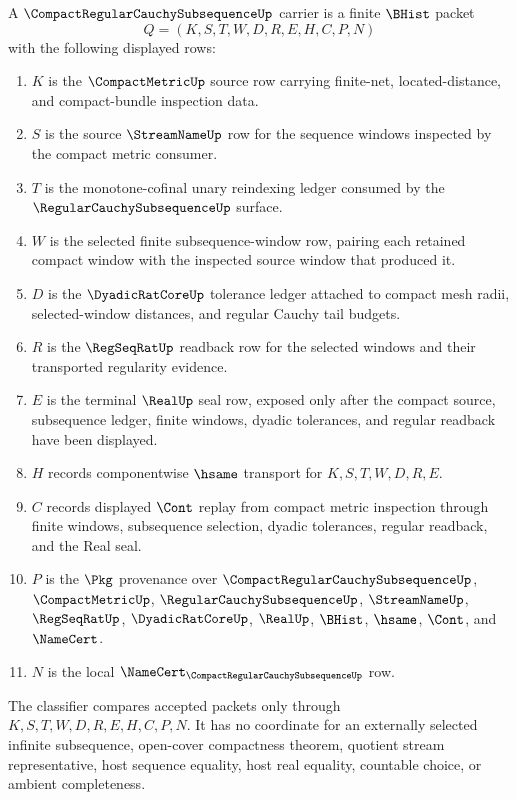 \begin{definition}
\label{def:compact-regular-cauchy-subsequence-carrier}
A $\CompactRegularCauchySubsequenceUp$ carrier is a finite $\BHist$ packet
$$
Q=(K,S,T,W,D,R,E,H,C,P,N)
$$
with the following displayed rows:
\begin{enumerate}
\item $K$ is the $\CompactMetricUp$ source row carrying finite-net, located-distance, and compact-bundle inspection data.
\item $S$ is the source $\StreamNameUp$ row for the sequence windows inspected by the compact metric consumer.
\item $T$ is the monotone-cofinal unary reindexing ledger consumed by the $\RegularCauchySubsequenceUp$ surface.
\item $W$ is the selected finite subsequence-window row, pairing each retained compact window with the inspected source window that produced it.
\item $D$ is the $\DyadicRatCoreUp$ tolerance ledger attached to compact mesh radii, selected-window distances, and regular Cauchy tail budgets.
\item $R$ is the $\RegSeqRatUp$ readback row for the selected windows and their transported regularity evidence.
\item $E$ is the terminal $\RealUp$ seal row, exposed only after the compact source, subsequence ledger, finite windows, dyadic tolerances, and regular readback have been displayed.
\item $H$ records componentwise $\hsame$ transport for $K,S,T,W,D,R,E$.
\item $C$ records displayed $\Cont$ replay from compact metric inspection through finite windows, subsequence selection, dyadic tolerances, regular readback, and the Real seal.
\item $P$ is the $\Pkg$ provenance over $\CompactRegularCauchySubsequenceUp$, $\CompactMetricUp$, $\RegularCauchySubsequenceUp$, $\StreamNameUp$, $\RegSeqRatUp$, $\DyadicRatCoreUp$, $\RealUp$, $\BHist$, $\hsame$, $\Cont$, and $\NameCert$.
\item $N$ is the local $\NameCert_{\CompactRegularCauchySubsequenceUp}$ row.
\end{enumerate}
The classifier compares accepted packets only through $K,S,T,W,D,R,E,H,C,P,N$. It has no coordinate for an externally selected infinite subsequence, open-cover compactness theorem, quotient stream representative, host sequence equality, host real equality, countable choice, or ambient completeness.
\end{definition}

